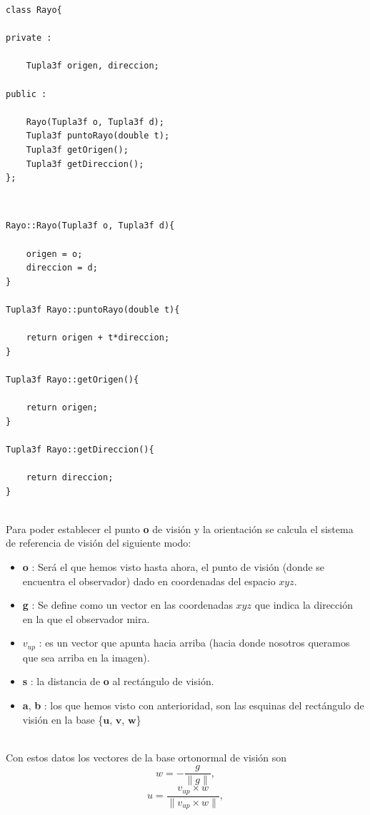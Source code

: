 \begin{lstlisting}[style=Consola]
class Rayo{

private :

	Tupla3f origen, direccion;

public :

	Rayo(Tupla3f o, Tupla3f d);
	Tupla3f puntoRayo(double t);
	Tupla3f getOrigen();
	Tupla3f getDireccion();
};
\end{lstlisting}
${ }$\\

\begin{lstlisting}[style=Consola]
Rayo::Rayo(Tupla3f o, Tupla3f d){

	origen = o;
	direccion = d;
}

Tupla3f Rayo::puntoRayo(double t){

	return origen + t*direccion;
}

Tupla3f Rayo::getOrigen(){

	return origen;
}

Tupla3f Rayo::getDireccion(){

	return direccion;
}
\end{lstlisting}
${ }$\\

Para poder establecer el punto \textbf{o} de visión y la orientación se calcula el sistema de referencia de visión del siguiente modo:
\begin{itemize}
	\item \textbf{o} : Será el que hemos visto hasta ahora, el punto de visión (donde se encuentra el observador) dado en coordenadas del espacio $xyz$.
	\item \textbf{g} : Se define como un vector en las coordenadas $xyz$ que indica la dirección en la que el observador mira.
	\item \textbf{$v_{up}$} : es un vector que apunta hacia arriba (hacia donde nosotros queramos que sea arriba en la imagen).
	\item \textbf{s} : la distancia de \textbf{o} al rectángulo de visión.
	\item \textbf{a}, \textbf{b} : los que hemos visto con anterioridad, son las esquinas del rectángulo de visión en la base \{$\textbf{u}$, $\textbf{v}$, $\textbf{w}$\}
\end{itemize}
${ }$\\

Con estos datos los vectores de la base ortonormal de visión son
${ }$\\
	\[
		w = - \frac{g}{\parallel g \parallel},
	\]
	\[
		u = \frac{v_{up} \times w}{\parallel v_{up} \times w \parallel},
	\]
	
